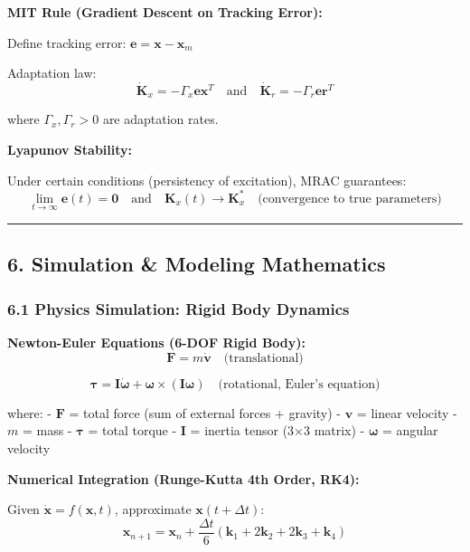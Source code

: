 \documentclass[
]{article}
\begin{document}
\textbf{MIT Rule (Gradient Descent on Tracking Error):}

Define tracking error: \(\mathbf{e} = \mathbf{x} - \mathbf{x}_m\)

Adaptation law: \[
\dot{\mathbf{K}}_x = -\Gamma_x \mathbf{e} \mathbf{x}^T \quad \text{and} \quad \dot{\mathbf{K}}_r = -\Gamma_r \mathbf{e} \mathbf{r}^T
\]

where \(\Gamma_x, \Gamma_r > 0\) are adaptation rates.

\textbf{Lyapunov Stability:}

Under certain conditions (persistency of excitation), MRAC guarantees:
\[
\lim_{t \to \infty} \mathbf{e}(t) = \mathbf{0} \quad \text{and} \quad \mathbf{K}_x(t) \to \mathbf{K}_x^* \quad \text{(convergence to true parameters)}
\]

\begin{center}\rule{0.5\linewidth}{0.5pt}\end{center}

\hypertarget{simulation-modeling-mathematics}{%
\subsection{6. Simulation \& Modeling
Mathematics}\label{simulation-modeling-mathematics}}

\hypertarget{physics-simulation-rigid-body-dynamics}{%
\subsubsection{6.1 Physics Simulation: Rigid Body
Dynamics}\label{physics-simulation-rigid-body-dynamics}}

\textbf{Newton-Euler Equations (6-DOF Rigid Body):} \[
\mathbf{F} = m \dot{\mathbf{v}} \quad \text{(translational)}
\]

\[
\boldsymbol{\tau} = \mathbf{I} \dot{\boldsymbol{\omega}} + \boldsymbol{\omega} \times (\mathbf{I} \boldsymbol{\omega}) \quad \text{(rotational, Euler's equation)}
\]

where: - \(\mathbf{F}\) = total force (sum of external forces + gravity)
- \(\mathbf{v}\) = linear velocity - \(m\) = mass -
\(\boldsymbol{\tau}\) = total torque - \(\mathbf{I}\) = inertia tensor
(3×3 matrix) - \(\boldsymbol{\omega}\) = angular velocity

\textbf{Numerical Integration (Runge-Kutta 4th Order, RK4):}

Given \(\dot{\mathbf{x}} = f(\mathbf{x}, t)\), approximate
\(\mathbf{x}(t + \Delta t)\): \[
\mathbf{x}_{n+1} = \mathbf{x}_n + \frac{\Delta t}{6} (\mathbf{k}_1 + 2\mathbf{k}_2 + 2\mathbf{k}_3 + \mathbf{k}_4)
\]
\end{document}

